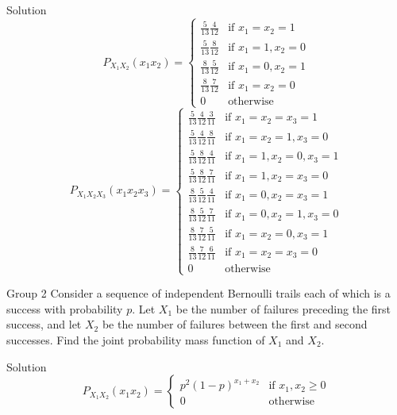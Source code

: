 \documentclass{article}
\theoremstyle{plain}
\theoremstyle{definition}
\theoremstyle{remark}
\begin{document}
\begin{solution}
    {Solution}
    \[
    P_{X_1X_2}(x_1x_2) = {
        \begin{cases}
            \frac{5}{13}\frac{4}{12} & \text{if } x_1=x_2=1\\
            \frac{5}{13}\frac{8}{12} & \text{if } x_1=1, x_2=0\\
            \frac{8}{13}\frac{5}{12} & \text{if } x_1=0, x_2=1\\
            \frac{8}{13}\frac{7}{12} & \text{if } x_1=x_2=0\\
            0 & \text{otherwise}
        \end{cases}
    }
    \]
    \[
        P_{X_1X_2X_3}(x_1x_2x_3) = {
            \begin{cases}
                \frac{5}{13}\frac{4}{12}\frac{3}{11} & \text{if } x_1=x_2=x_3=1\\
                \frac{5}{13}\frac{4}{12}\frac{8}{11} & \text{if } x_1=x_2=1, x_3=0\\
                \frac{5}{13}\frac{8}{12}\frac{4}{11} & \text{if } x_1=1, x_2=0, x_3=1\\
                \frac{5}{13}\frac{8}{12}\frac{7}{11} & \text{if } x_1=1, x_2=x_3=0\\
                \frac{8}{13}\frac{5}{12}\frac{4}{11} & \text{if } x_1=0, x_2=x_3=1\\
                \frac{8}{13}\frac{5}{12}\frac{7}{11} & \text{if } x_1=0, x_2=1, x_3=0\\
                \frac{8}{13}\frac{7}{12}\frac{5}{11} & \text{if } x_1=x_2=0, x_3=1\\
                \frac{8}{13}\frac{7}{12}\frac{6}{11} & \text{if } x_1=x_2=x_3=0\\
                0 & \text{otherwise}
            \end{cases}
        }
    \]
\end{solution}

\begin{problem}
    {Group 2}
    Consider a sequence of independent Bernoulli trails each of which is a success with probability $p$. Let $X_1$ be the number of failures preceding the first success, and let $X_2$ be the number of failures between the first and second successes. Find the joint probability mass function of $X_1$ and $X_2$.
\end{problem}

\begin{solution}
    {Solution}
    \[
        P_{X_1X_2}(x_1x_2) = {
            \begin{cases}
                p^2(1-p)^{x_1+x_2} & \text{if } x_1,x_2\geq 0\\
                0 & \text{otherwise}
            \end{cases}
        }
    \]
\end{solution}
\end{document}
